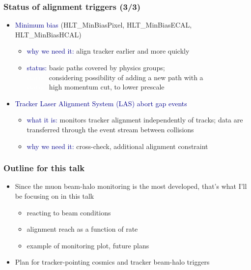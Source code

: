 \documentclass[compress]{beamer}
\begin{document}
\begin{frame}
\frametitle{Status of alignment triggers (3/3)}

\begin{itemize}\setlength{\itemsep}{0.5 cm}
\item \textcolor{darkblue}{Minimum bias} {\scriptsize (HLT\_MinBiasPixel, HLT\_MinBiasECAL, HLT\_MinBiasHCAL)}
\begin{itemize}
\item \textcolor{darkblue}{why we need it:} align tracker earlier and more quickly
\item \textcolor{darkblue}{status:} basic paths covered by physics groups; \\
\textcolor{white}{status:} considering possibility of adding a new path with a \\
\textcolor{white}{status:} high momentum cut, to lower prescale
\end{itemize}

\item \textcolor{darkblue}{Tracker Laser Alignment System (LAS) abort gap events}
\begin{itemize}
\item \textcolor{darkblue}{what it is:} monitors tracker alignment independently of tracks; data are transferred through the event stream between collisions
\item \textcolor{darkblue}{why we need it:} cross-check, additional alignment constraint
\end{itemize}
\end{itemize}

\end{frame}

\begin{frame}
\frametitle{Outline for this talk}

\begin{itemize}\setlength{\itemsep}{0.5 cm}
\item Since the muon beam-halo monitoring is the most developed,
  that's what I'll be focusing on in this talk
\begin{itemize}\setlength{\itemsep}{0.25 cm}
\item reacting to beam conditions
\item alignment reach as a function of rate
\item example of monitoring plot, future plans
\end{itemize}

\item Plan for tracker-pointing cosmics and tracker beam-halo triggers
\end{itemize}
\end{frame}
\end{document}

